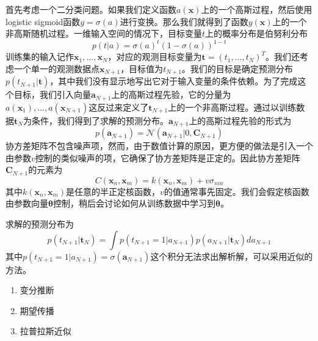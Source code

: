 首先考虑一个二分类问题。如果我们定义函数$a(\boldsymbol{x})$上的一个高斯过程，然后使用logistic sigmoid函数$y=\sigma(a)$进行变换。那么我们就得到了函数$y(\boldsymbol{x})$上的一个非高斯随机过程。一维输入空间的情况下，目标变量$t$上的概率分布是伯努利分布
\begin{equation}
	p(t|a)=\sigma(a)^t(1-\sigma(a))^{1-t}
\end{equation}
训练集的输入记作$\boldsymbol{x}_1,\dots,\boldsymbol{x}_N$，对应的观测目标变量为$\boldsymbol{t}=(t_1,\dots,t_N)^T$。我们还考虑一个单一的观测数据点$\boldsymbol{x}_{N+1}$，目标值为$t_{N+1}$。我们的目标是确定预测分布$p(t_{N+1}|\boldsymbol{t})$，其中我们没有显示地写出它对于输入变量的条件依赖。为了完成这个目标，我们引入向量$\boldsymbol{a}_{N+1}$上的高斯过程先验，它的分量为$a(\boldsymbol{x}_1),\dots,a(\boldsymbol{x}_{N+1})$这反过来定义了$\boldsymbol{t}_{N+1}$上的一个非高斯过程。通过以训练数据$\boldsymbol{t}_{N}$为条件，我们得到了求解的预测分布。$\boldsymbol{a}_{N+1}$上的高斯过程先验的形式为
\begin{equation}
	p(\boldsymbol{a}_{N+1})=\mathcal{N}(\boldsymbol{a}_{N+1}|0,\boldsymbol{C}_{N+1})
\end{equation}
协方差矩阵不包含噪声项，然而，由于数值计算的原因，更方便的做法是引入一个由参数$v$控制的类似噪声的项，它确保了协方差矩阵是正定的。因此协方差矩阵$\boldsymbol{C}_{N+1}$的元素为
\begin{equation}
	C(\boldsymbol{x}_n,\boldsymbol{x}_m)=k(\boldsymbol{x}_n,\boldsymbol{x}_m)+v\sigma_{nm}
\end{equation}
其中$k(\boldsymbol{x}_n,\boldsymbol{x}_m)$是任意的半正定核函数，$v$的值通常事先固定。我们会假定核函数由参数向量$\boldsymbol{\theta}$控制，稍后会讨论如何从训练数据中学习到$\boldsymbol{\theta}$。

求解的预测分布为
\begin{equation}
\label{yuce}
	p(t_{N+1}|\boldsymbol{t}_N)=\int p(t_{N+1}=1|a_{N+1})p(a_{N+1}|\boldsymbol{t}_{N})da_{N+1}
\end{equation}
其中$p(t_{N+1}=1|a_{N+1})=\sigma(\boldsymbol{a}_{N+1})$这个积分无法求出解析解，可以采用近似的方法。
\begin{enumerate}
	\item 变分推断
	\item 期望传播
	\item 拉普拉斯近似
\end{enumerate}
